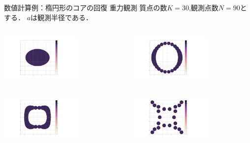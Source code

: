 \documentclass[dvipdfmx]{beamer}
\theoremstyle{remark}
\begin{document}
\begin{frame}{数値計算例：楕円形のコアの回復 重力観測}
  質点の数$K=30$,観測点数$N=90$とする．
  $a$は観測半径である．
  \begin{columns}
    \begin{column}{0.38\columnwidth}
      \centering
      \includegraphics[width=4cm]{fig/elliptic.png}
    \end{column}
    \hspace{-1cm}
    \begin{column}{0.38\columnwidth}
      \centering
      \includegraphics[width=4cm]{fig/GR4N90K30E2.png}
    \end{column}
  \end{columns}

  \begin{columns}
    \begin{column}{0.38\columnwidth}
      \centering
      \includegraphics[width=4cm]{fig/GR10N90K30E2.png}
    \end{column}
    \hspace{-1cm}
    \begin{column}{0.38\columnwidth}
      \centering
      \includegraphics[width=4cm]{fig/GR30N90K30E2.png}
    \end{column}
  \end{columns}


\end{frame}
\end{document}
